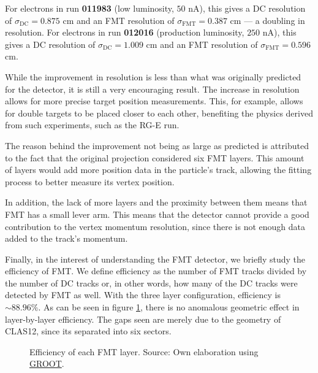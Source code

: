     For electrons in run \textbf{011983} (low luminosity, $50$ nA), this gives a DC resolution of $\sigma_\text{DC} = 0.875$ cm and an FMT resolution of $\sigma_\text{FMT} = 0.387$ cm --- a doubling in resolution.
    For electrons in run \textbf{012016} (production luminosity, $250$ nA), this gives a DC resolution of $\sigma_\text{DC} = 1.009$ cm and an FMT resolution of $\sigma_\text{FMT} = 0.596$ cm.


    While the improvement in resolution is less than what was originally predicted for the detector, it is still a very encouraging result.
    The increase in resolution allows for more precise target position measurements.
    This, for example, allows for double targets to be placed closer to each other, benefiting the physics derived from such experiments, such as the RG-E run. %

    The reason behind the improvement not being as large as predicted is attributed to the fact that the original projection considered six FMT layers.
    This amount of layers would add more position data in the particle's track, allowing the fitting process to better measure its vertex position.

    In addition, the lack of more layers and the proximity between them means that FMT has a small lever arm.
    This means that the detector cannot provide a good contribution to the vertex momentum resolution, since there is not enough data added to the track's momentum. %

    Finally, in the interest of understanding the FMT detector, we briefly study the efficiency of FMT.
    We define efficiency as the number of FMT tracks divided by the number of DC tracks or, in other words, how many of the DC tracks were detected by FMT as well.
    With the three layer configuration, efficiency is $\sim 88.96\%$.
    As can be seen in figure \ref{fig::fmt_efficiency}, there is no anomalous geometric effect in layer-by-layer efficiency.
    The gaps seen are merely due to the geometry of CLAS12, since its separated into six sectors.

    \begin{figure}[b]
        \centering{}
        \caption[FMT layers efficiency]{Efficiency of each FMT layer.
        Source: Own elaboration using \hyperlink{github.com/gavalian/groot}{GROOT}.}
        \label{fig::fmt_efficiency}
    \end{figure}
